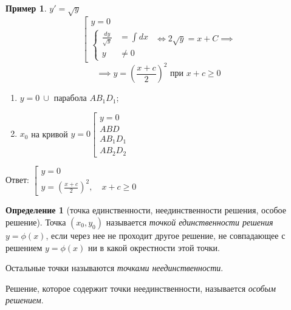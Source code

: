 \documentclass[11pt,a4paper,oneside]{report}
\theoremstyle{definition}
\newtheorem{definition}{Определение}[section]
\newtheorem{example}{Пример}
\theoremstyle{plain}
\theoremstyle{remark}
\begin{document}
\begin{example}
    $y' = \sqrt{y}$
    \begin{equation*}
        \left[\begin{array}{l}
            y = 0 \\
            \left\{\begin{array}{rl}
                       \frac{dy}{\sqrt{y}} & = \int dx \\
                       y                   & \ne 0
                   \end{array}\right.
        \end{array}\right. \iff 2\sqrt{y} = x + C \implies
    \end{equation*}
    \begin{equation*}
        \implies y = \left(\frac{x + c}{2}\right)^2\text{ при }x + c \geqslant 0
    \end{equation*}

    \begin{enumerate}
        \item $y = 0 \ \cup$ парабола $AB_1D_1$;
        \item $x_0$ на кривой $y = 0 \left[\begin{array}{l}
                      y = 0   \\
                      ABD     \\
                      AB_1D_1 \\
                      AB_2D_2
                  \end{array}\right.$
    \end{enumerate}

    Ответ: $\left[\begin{array}{l}
            y = 0 \\
            y = \left(\frac{x + c}{2}\right)^2, \quad x + c \geqslant 0
        \end{array}\right.$
\end{example}

\begin{definition}[точка единственности, неединственности решения, особое решение]
    Точка $(x_0, y_0)$ называется \emph{точкой единственности решения} $y = \phi(x)$, если через нее не проходит другое решение, не совпадающее с решением $y = \phi(x)$ ни в какой окрестности этой точки.

    Остальные точки называются \emph{точками неединственности}.

    Решение, которое содержит точки неединственности, называется \emph{особым решением}.
\end{definition}
\end{document}
